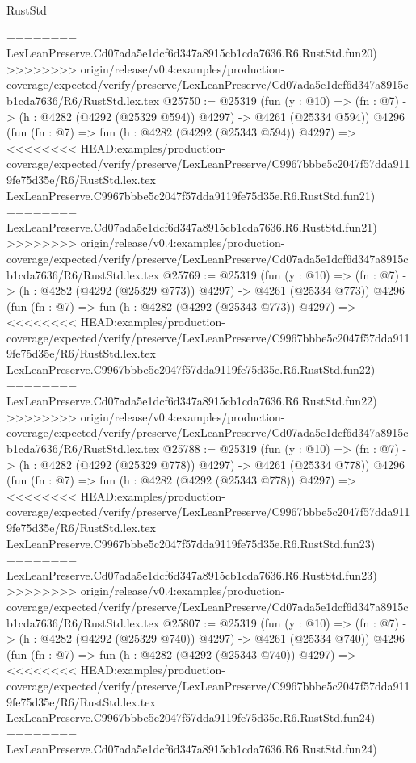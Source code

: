 \begin{lexlean}{RustStd}
\begin{coremodule}
{\begin{coremodule}
{{{{{{{{{{{{{{{{{{{{{{{{{{{{{{{{{{{========
    LexLeanPreserve.Cd07ada5e1dcf6d347a8915cb1cda7636.R6.RustStd.fun20)
>>>>>>>> origin/release/v0.4:examples/production-coverage/expected/verify/preserve/LexLeanPreserve/Cd07ada5e1dcf6d347a8915cb1cda7636/R6/RustStd.lex.tex
@25750 := @25319
    (fun (y : @10) => (fn : @7) -> (h : @4282 (@4292 (@25329 @594)) @4297) -> @4261 (@25334 @594))
    @4296
    (fun (fn : @7) =>
    fun (h : @4282 (@4292 (@25343 @594)) @4297) =>
<<<<<<<< HEAD:examples/production-coverage/expected/verify/preserve/LexLeanPreserve/C9967bbbe5c2047f57dda9119fe75d35e/R6/RustStd.lex.tex
    LexLeanPreserve.C9967bbbe5c2047f57dda9119fe75d35e.R6.RustStd.fun21)
========
    LexLeanPreserve.Cd07ada5e1dcf6d347a8915cb1cda7636.R6.RustStd.fun21)
>>>>>>>> origin/release/v0.4:examples/production-coverage/expected/verify/preserve/LexLeanPreserve/Cd07ada5e1dcf6d347a8915cb1cda7636/R6/RustStd.lex.tex
@25769 := @25319
    (fun (y : @10) => (fn : @7) -> (h : @4282 (@4292 (@25329 @773)) @4297) -> @4261 (@25334 @773))
    @4296
    (fun (fn : @7) =>
    fun (h : @4282 (@4292 (@25343 @773)) @4297) =>
<<<<<<<< HEAD:examples/production-coverage/expected/verify/preserve/LexLeanPreserve/C9967bbbe5c2047f57dda9119fe75d35e/R6/RustStd.lex.tex
    LexLeanPreserve.C9967bbbe5c2047f57dda9119fe75d35e.R6.RustStd.fun22)
========
    LexLeanPreserve.Cd07ada5e1dcf6d347a8915cb1cda7636.R6.RustStd.fun22)
>>>>>>>> origin/release/v0.4:examples/production-coverage/expected/verify/preserve/LexLeanPreserve/Cd07ada5e1dcf6d347a8915cb1cda7636/R6/RustStd.lex.tex
@25788 := @25319
    (fun (y : @10) => (fn : @7) -> (h : @4282 (@4292 (@25329 @778)) @4297) -> @4261 (@25334 @778))
    @4296
    (fun (fn : @7) =>
    fun (h : @4282 (@4292 (@25343 @778)) @4297) =>
<<<<<<<< HEAD:examples/production-coverage/expected/verify/preserve/LexLeanPreserve/C9967bbbe5c2047f57dda9119fe75d35e/R6/RustStd.lex.tex
    LexLeanPreserve.C9967bbbe5c2047f57dda9119fe75d35e.R6.RustStd.fun23)
========
    LexLeanPreserve.Cd07ada5e1dcf6d347a8915cb1cda7636.R6.RustStd.fun23)
>>>>>>>> origin/release/v0.4:examples/production-coverage/expected/verify/preserve/LexLeanPreserve/Cd07ada5e1dcf6d347a8915cb1cda7636/R6/RustStd.lex.tex
@25807 := @25319
    (fun (y : @10) => (fn : @7) -> (h : @4282 (@4292 (@25329 @740)) @4297) -> @4261 (@25334 @740))
    @4296
    (fun (fn : @7) =>
    fun (h : @4282 (@4292 (@25343 @740)) @4297) =>
<<<<<<<< HEAD:examples/production-coverage/expected/verify/preserve/LexLeanPreserve/C9967bbbe5c2047f57dda9119fe75d35e/R6/RustStd.lex.tex
    LexLeanPreserve.C9967bbbe5c2047f57dda9119fe75d35e.R6.RustStd.fun24)
========
    LexLeanPreserve.Cd07ada5e1dcf6d347a8915cb1cda7636.R6.RustStd.fun24)
}}}}}}}}}}}}}}}}}}}}}}}}}}}}}}}}}}}
\end{coremodule}}
\end{coremodule}
\end{lexlean}
